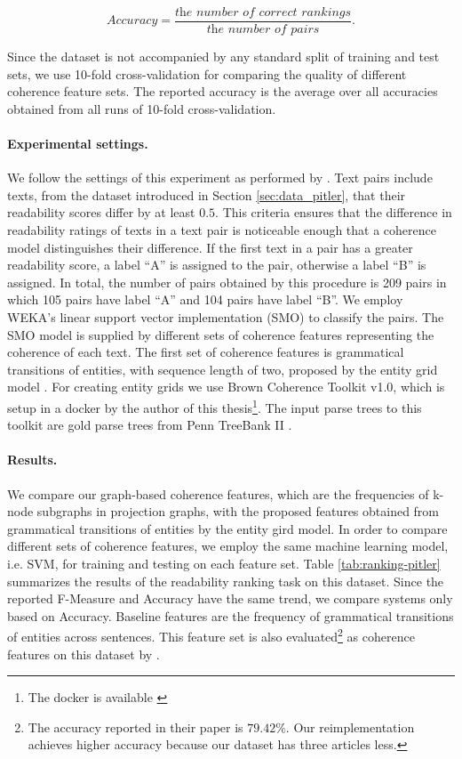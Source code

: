 \begin{equation}
Accuracy = \frac{\textit{the number of correct rankings}}{\textit{the number of pairs}}. 
\end{equation}

Since the dataset is not accompanied by any standard split of training and test sets, we use 10-fold cross-validation for comparing the quality of different coherence feature sets. 
The reported accuracy is the average over all accuracies obtained from all runs of 10-fold cross-validation. 


\paragraph{Experimental settings.}
We follow the settings of this experiment as performed by . 
Text pairs include texts, from the dataset introduced in Section \ref{sec:data_pitler}, that their readability scores differ by at least $0.5$. 
This criteria ensures that the difference in readability ratings of texts in a text pair is noticeable enough that a coherence model distinguishes their difference. 
If the first text in a pair has a greater readability score, a label ``A'' is assigned to the pair, otherwise a label ``B'' is assigned. 
In total, the number of pairs obtained by this procedure is 209 pairs in which 105 pairs have label ``A''  and 104 pairs have label ``B''.  
We employ WEKA's linear support vector implementation (SMO) to classify the pairs.
The SMO model is supplied by different sets of coherence features representing the coherence of each text. 
The first set of coherence features is grammatical transitions of entities, with sequence length of two, proposed by the entity grid model \cite{barzilay05a,barzilay08}. 
For creating entity grids we use Brown Coherence Toolkit v1.0, which is setup in a docker by the author of this thesis\footnote{The docker is available \url{}}. 
The input parse trees to this toolkit are gold parse trees from Penn TreeBank II \cite{marcus94}. 

\paragraph{Results.}
We compare our graph-based coherence features, which are the frequencies of \mbox{k-node} subgraphs in projection graphs, with the proposed features obtained from grammatical transitions of entities by the entity gird model. 
In order to compare different sets of coherence features, we employ the same machine learning model, i.e. SVM, for training and testing on each feature set. 
Table \ref{tab:ranking-pitler} summarizes the results of the readability ranking task on this dataset. 
Since the reported F-Measure and Accuracy have the same trend, we compare systems only based on Accuracy.  
Baseline features are the frequency of grammatical transitions of entities across sentences. 
This feature set is also evaluated\footnote{The accuracy reported in their paper is $79.42\%$. Our reimplementation achieves higher accuracy because our dataset has three articles less.} as coherence features on this dataset by .

